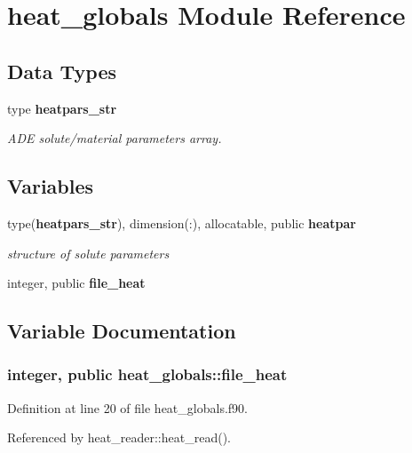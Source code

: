 \section{heat\+\_\+globals Module Reference}
\label{namespaceheat__globals}
\subsection*{Data Types}
\begin{DoxyCompactItemize}
\item 
type {\bf heatpars\+\_\+str}
\begin{DoxyCompactList}\small\item\em A\+DE solute/material parameters array. \end{DoxyCompactList}\end{DoxyCompactItemize}
\subsection*{Variables}
\begin{DoxyCompactItemize}
\item 
type({\bf heatpars\+\_\+str}), dimension(\+:), allocatable, public {\bf heatpar}
\begin{DoxyCompactList}\small\item\em structure of solute parameters \end{DoxyCompactList}\item 
integer, public {\bf file\+\_\+heat}
\end{DoxyCompactItemize}


\subsection{Variable Documentation}
\subsubsection[{file\+\_\+heat}]{\setlength{\rightskip}{0pt plus 5cm}integer, public heat\+\_\+globals\+::file\+\_\+heat}\label{namespaceheat__globals_ae6cd0aae7b5239fd359b17dad91c404d}


Definition at line 20 of file heat\+\_\+globals.\+f90.



Referenced by heat\+\_\+reader\+::heat\+\_\+read().


